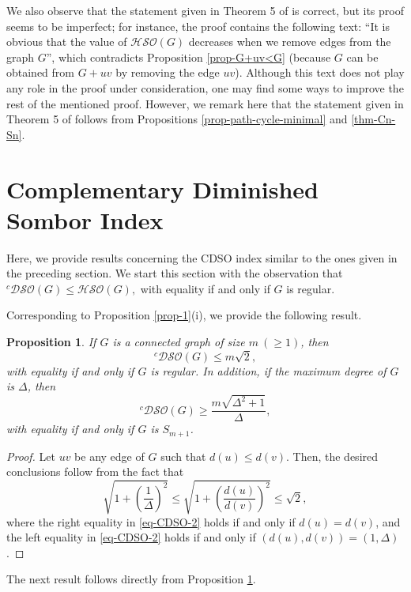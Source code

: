 \documentclass[12pt,a4paper]{article}
\newtheorem{proposition}{Proposition}[section]
\begin{document}
We also observe that the statement given in Theorem 5 of \cite{Barman-MATCH-26} is correct, but its proof seems to be imperfect; for instance, the proof contains the following text: ``It is obvious that the value of $\mathcal{HSO}(G)$ decreases when we remove edges from the graph $G$'', which contradicts Proposition \ref{prop-G+uv<G} (because $G$ can be obtained from $G+uv$ by removing the edge $uv$). Although this text does not play any role in the proof under consideration, one may find some ways to improve the rest of the mentioned proof.
However, we remark here that the statement given in Theorem 5 of \cite{Barman-MATCH-26} follows from Propositions \ref{prop-path-cycle-minimal} and \ref{thm-Cn-Sn}.



\section{Complementary Diminished Sombor Index}

Here, we provide results concerning the CDSO index similar to the ones given in the preceding section.
We start this section with the observation that $^c\mathcal{DSO}(G)\le \mathcal{HSO}(G),$
with equality if and only if $G$ is regular.

Corresponding to Proposition \ref{prop-1}(i), we provide the following result.

\begin{proposition}\label{prop-size-bound}
If $G$ is a connected graph of size $m\ (\ge1)$, then
$$^c\mathcal{DSO}(G) \le m\sqrt{2},$$
with equality if and only if $G$ is regular. In addition, if the maximum degree of $G$ is $\Delta$, then
$$^c\mathcal{DSO}(G) \ge \frac{m\sqrt{\Delta^2+1}}{\Delta},$$
with equality if and only if $G$ is $S_{m+1}$.
\end{proposition}

\begin{proof}
Let $uv$ be any edge of $G$ such that $d(u)\le d(v)$. Then, the desired conclusions follow from the fact that
\begin{equation}\label{eq-CDSO-2}
\sqrt{1+\left(\frac{1}{\Delta}\right)^2} \le  \sqrt{1+\left(\frac{d(u)}{d(v)}\right)^2} \le \sqrt{2},
\end{equation}
where the right equality in \eqref{eq-CDSO-2} holds if and only if $d(u)=d(v)$, and the left equality in \eqref{eq-CDSO-2} holds if and only if $(d(u),d(v))=(1,\Delta)$.
\end{proof}


The next result follows directly from Proposition \ref{prop-size-bound}.
\end{document}
